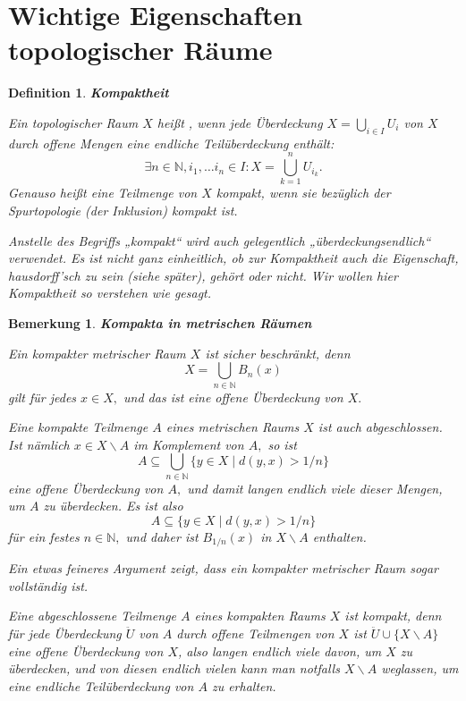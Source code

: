 \documentclass[12pt]{scrbook}   %
\newtheorem{bem}[alles]{Bemerkung}
\newtheorem{defini}[alles]{Definition}
\begin{document}
\section{Wichtige Eigenschaften topologischer Räume}
\begin{defini} {\bf Kompaktheit}

{\rm Ein topologischer Raum $X$ heißt , wenn
jede Überdeckung $X=\bigcup_{i\in I}U_i$ von $X$ durch offene Mengen eine
endliche Teilüberdeckung enthält: 
$$\exists n\in \mathbb N, i_1,\dots i_n\in I: X=\bigcup_{k=1}^n U_{i_k}.$$
Genauso heißt eine Teilmenge von $X$ kompakt, wenn sie bezüglich der 
Spurtopologie (der Inklusion) kompakt ist.

Anstelle des Begriffs „kompakt“ wird auch gelegentlich 
„überdeckungsendlich“ verwendet. Es ist nicht ganz einheitlich, ob 
zur Kompaktheit auch die Eigenschaft, hausdorff'sch zu sein (siehe später), 
gehört oder 
nicht. Wir wollen hier Kompaktheit so verstehen wie gesagt.
}
\end{defini}
\begin{bem} {\bf Kompakta in metrischen Räumen}

{\rm Ein kompakter metrischer Raum $X$ ist sicher beschränkt, denn 
$$X=\bigcup_{n\in \mathbb N} B_n(x)$$
gilt für jedes $x\in X,$ und das ist eine offene Überdeckung von $X.$

Eine kompakte Teilmenge $A$ eines metrischen Raums $X$ ist 
auch abgeschlossen. Ist nämlich $x\in X\smallsetminus A$ im Komplement von 
$A,$ so ist 
$$A\subseteq \bigcup_{n\in \mathbb N} \{y\in X\mid d(y,x)> 1/n \}$$
eine offene Überdeckung von $A,$ und damit langen endlich viele dieser
Mengen, um $A$ zu überdecken. Es ist also 
$$A\subseteq \{y\in X\mid d(y,x)> 1/n \}$$
für ein festes $n\in \mathbb N,$ und daher ist $B_{1/n}(x)$ in 
$X\smallsetminus A$ enthalten.

Ein etwas feineres Argument zeigt, dass ein kompakter metrischer Raum sogar
vollständig ist.

Eine abgeschlossene Teilmenge $A$ eines kompakten Raums $X$ ist kompakt, denn
für jede Überdeckung $\ddot U$ von $A$ durch offene Teilmengen von $X$ 
ist $\ddot U\cup\{X\smallsetminus A\}$ eine offene Überdeckung von $X$, also
langen endlich viele davon, um $X$ zu überdecken, und von diesen endlich
vielen kann man notfalls $X\smallsetminus A$ weglassen, um eine endliche 
Teilüberdeckung von $A$ zu erhalten.


}

\end{bem}
\end{document}

